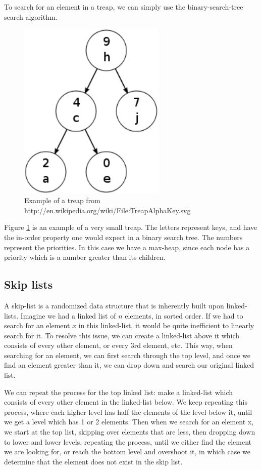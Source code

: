 \documentclass[oribibl]{llncs}
\begin{document}
To search for an element in a treap, we can simply use the binary-search-tree search algorithm.

\begin{figure}[here]
\center
\includegraphics[width=7cm]{images/treap}
\caption{Example of a treap from http://en.wikipedia.org/wiki/File:TreapAlphaKey.svg}
\label{fig:treap}
\end{figure}

Figure \ref{fig:treap} is an example of a very small treap. The letters represent keys, and have the in-order property one would expect in a binary search tree. The numbers represent the priorities. In this case we have a max-heap, since each node has a priority which is a number greater than its children.

\subsection{Skip lists}
A skip-list \cite{skip_list} is a randomized data structure that is inherently built upon linked-lists. Imagine we had a linked list of $n$ elements, in sorted order. If we had to search for an element $x$ in this linked-list, it would be quite inefficient to linearly search for it. To resolve this issue, we can create a linked-list above it which consists of every other element, or every 3rd element, etc. This way, when searching for an element, we can first search through the top level, and once we find an element greater than it, we can drop down and search our original linked list.

We can repeat the process for the top linked list: make a linked-list which consists of every other element in the linked-list below. We keep repeating this process, where each higher level has half the elements of the level below it, until we get a level which has 1 or 2 elements. Then when we search for an element x, we start at the top list, skipping over elements that are less, then dropping down to lower and lower levels, repeating the process, until we either find the element we are looking for, or reach the bottom level and overshoot it, in which case we determine that the element does not exist in the skip list.
\end{document}
